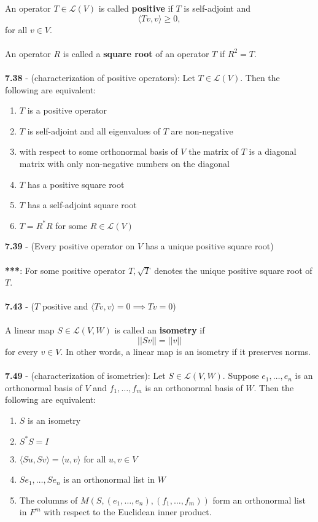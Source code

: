 \documentclass{article}
\theoremstyle{definition}
\begin{document}
An operator $T \in \mathcal{L}(V)$ is called \textbf{positive} if $T$ is self-adjoint and $$\langle Tv, v \rangle \geq 0,$$ for all $v \in V$. \\ \\
An operator $R$ is called a \textbf{square root} of an operator $T$ if $R^2 = T$. \\ \\
\textbf{7.38} - (characterization of positive operators): Let $T \in \mathcal{L}(V)$. Then the following are equivalent: \begin{enumerate}
    \item $T$ is a positive operator
    \item $T$ is self-adjoint and all eigenvalues of $T$ are non-negative
    \item with respect to some orthonormal basis of $V$ the matrix of $T$ is a diagonal matrix with only non-negative numbers on the diagonal
    \item $T$ has a positive square root
    \item $T$ has a self-adjoint square root
    \item $T = R^*R$ for some $R \in \mathcal{L}(V)$
\end{enumerate} $ $ \\
\textbf{7.39} - (Every positive operator on $V$ has a unique positive square root) \\ \\
\textbf{***}: For some positive operator $T, \sqrt{T}$ denotes the unique positive square root of $T$. \\ \\
\textbf{7.43} - ($T$ positive and $\langle Tv, v \rangle = 0 \implies Tv = 0$) \\ \\
A linear map $S \in \mathcal{L}(V, W)$ is called an \textbf{isometry} if $$||Sv|| = ||v||$$ for every $v \in V$. In other words, a linear map is an isometry if it preserves norms. \\ \\
\textbf{7.49} - (characterization of isometries): Let $S \in \mathcal{L}(V, W)$. Suppose $e_1, \dots, e_n$ is an orthonormal basis of $V$ and $f_1, \dots, f_m$ is an orthonormal basis of $W$. Then the following are equivalent: \begin{enumerate}
    \item $S$ is an isometry
    \item $S^*S = I$
    \item $\langle Su, Sv \rangle = \langle u, v \rangle$ for all $u, v \in V$
    \item $Se_1, \dots, Se_n$ is an orthonormal list in $W$
    \item The columns of $M(S, (e_1, \dots, e_n), (f_1, \dots, f_m))$ form an orthonormal list in $F^m$ with respect to the Euclidean inner product.
\end{enumerate} $ $ \\
\end{document}

